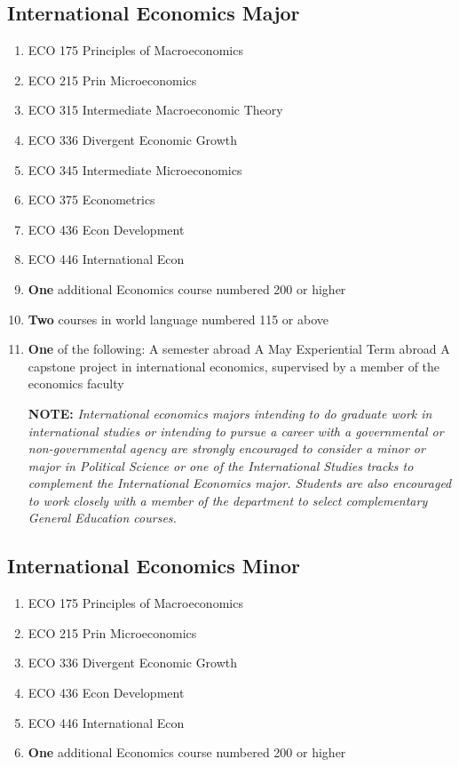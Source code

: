 \documentclass[
  letterpaper,
]{scrbook}
\providecommand{\tightlist}{%
  \setlength{\itemsep}{0pt}\setlength{\parskip}{0pt}}
\begin{document}
\subsection{International Economics
Major}\label{international-economics-major}

\begin{enumerate}
\def\labelenumi{\arabic{enumi}.}
\item
  ECO 175 Principles of Macroeconomics
\item
  ECO 215 Prin Microeconomics
\item
  ECO 315 Intermediate Macroeconomic Theory
\item
  ECO 336 Divergent Economic Growth
\item
  ECO 345 Intermediate Microeconomics
\item
  ECO 375 Econometrics
\item
  ECO 436 Econ Development
\item
  ECO 446 International Econ
\item
  \textbf{One} additional Economics course numbered 200 or higher
\item
  \textbf{Two} courses in world language numbered 115 or above
\item
  \textbf{One} of the following: A semester abroad A May Experiential
  Term abroad A capstone project in international economics, supervised
  by a member of the economics faculty

  \textbf{NOTE:} \emph{International economics majors intending to do
  graduate work in international studies or intending to pursue a career
  with a governmental or non-governmental agency are strongly encouraged
  to consider a minor or major in Political Science or one of the
  International Studies tracks to complement the International Economics
  major. Students are also encouraged to work closely with a member of
  the department to select complementary General Education courses.}
\end{enumerate}

\subsection{International Economics
Minor}\label{international-economics-minor}

\begin{enumerate}
\def\labelenumi{\arabic{enumi}.}
\tightlist
\item
  ECO 175 Principles of Macroeconomics\\
\item
  ECO 215 Prin Microeconomics\\
\item
  ECO 336 Divergent Economic Growth\\
\item
  ECO 436 Econ Development\\
\item
  ECO 446 International Econ\\
\item
  \textbf{One} additional Economics course numbered 200 or higher
\end{enumerate}
\end{document}
